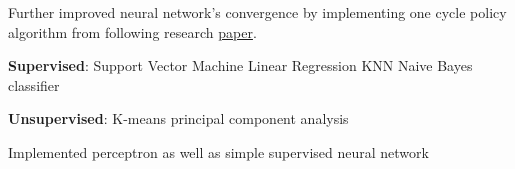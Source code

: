 \documentclass[]{CV}
\begin{document}
\begin{minipage}[t]{0.70\textwidth}
\begin{tightemize}
\item Further improved neural network's convergence by implementing one cycle policy algorithm from following research {\href{https://arxiv.org/abs/1506.01186}{paper}}.

\end{tightemize}
\sectionsep

\begin{tightemize}


\item  \textbf{Supervised}: Support Vector Machine \textbullet{} Linear Regression \textbullet{} KNN \textbullet{} Naive Bayes classifier

\item  \textbf{Unsupervised}: K-means \textbullet{} principal component analysis

\item Implemented perceptron as well as simple supervised neural network


\end{tightemize}
\sectionsep

%
%
%
%
%


%
%

\end{minipage} 
\end{document}
